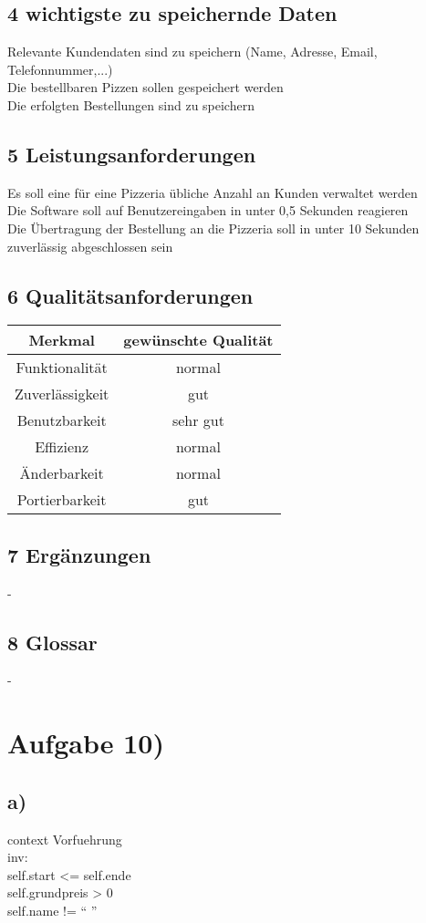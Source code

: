 \subsection*{4 wichtigste zu speichernde Daten}
 Relevante Kundendaten sind zu speichern (Name, Adresse, Email, Telefonnummer,...)\\
 Die bestellbaren Pizzen sollen gespeichert werden\\
 Die erfolgten Bestellungen sind zu speichern\\
\subsection*{5 Leistungsanforderungen}
  Es soll eine für eine Pizzeria übliche Anzahl an Kunden verwaltet werden\\
  Die Software soll auf Benutzereingaben in unter 0,5 Sekunden reagieren\\
  Die Übertragung der Bestellung an die Pizzeria soll in unter 10 Sekunden zuverlässig abgeschlossen sein
\subsection*{6 Qualitätsanforderungen}
\begin{tabular}{|c|c|}
\hline 
Merkmal & gewünschte Qualität \\ 
\hline 
Funktionalität & normal \\ 
Zuverlässigkeit & gut \\ 
Benutzbarkeit & sehr gut \\ 
Effizienz & normal \\ 
Änderbarkeit & normal \\ 
Portierbarkeit & gut \\ 
\hline 
\end{tabular}
\subsection*{7 Ergänzungen}
-
\subsection*{8 Glossar}
-

\section*{Aufgabe 10)}
\subsection*{a)}
context Vorfuehrung\\ \indent
\quad inv:\\ \indent
\qquad self.start <= self.ende\\ \indent
\qquad self.grundpreis > 0\\ \indent
\qquad self.name !=  \enquote{ }

